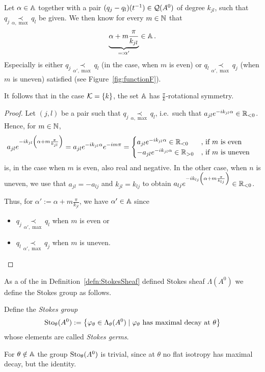 \begin{lem}\label{lem:rotationalSym}%
  Let $\alpha\in\mathbb{A}$ together with a pair $(q_j-q_l)(t^{-1})\in\mathcal{Q}(A^0)$ of
  degree $k_{jl}$, such that $q_j \underset{\alpha,\max}{\prec} q_l$ be given.
  We then know for every $m\in\mathbb{N}$ that
  \[
    \underset{=:\alpha'}{\underbrace{\alpha+m\frac{\pi}{k_{jl}}}} \in \mathbb{A} \,.
  \]
  Especially is either $q_j \underset{\alpha',\max}{\prec} q_l$ (in the
  case, when $m$ is even) or $q_l \underset{\alpha',\max}{\prec} q_j$
  (when $m$ is uneven) satisfied (see Figure~\ref{fig:functionF}).
  \begin{s-cor}
    It follows that in the case $\mathcal{K}=\{k\}$, the set $\mathbb{A}$ has
    $\frac{\pi}{k}$-rotational symmetry.
  \end{s-cor}
\end{lem}
\begin{proof}
  Let $(j,l)$ be a pair such that
  $q_j \underset{\alpha,\max}{\prec} q_l$, i.e.\ such that
  $a_{jl}e^{-ik_{jl}\alpha}\in\mathbb{R}_{<0}$.
  Hence, for $m\in\mathbb{N}$,
  \begin{align*}
    a_{jl}e^{-ik_{jl}\left(\alpha+m\frac{\pi}{k_{jl}}\right)}
    &=a_{jl}e^{-ik_{jl}\alpha}e^{-im\pi}
    = \begin{cases}
      a_{jl}e^{-ik_{jl}\alpha}\in\mathbb{R}_{<0}
        & \text{, if $m$ is even}
    \\-a_{jl}e^{-ik_{jl}\alpha}\in\mathbb{R}_{>0}
        & \text{, if $m$ is uneven}
    \end{cases}
  \end{align*}
  is, in the case when $m$ is even, also real and negative. In the other
  case, when $n$ is uneven, we use that $a_{jl}=-a_{lj}$ and $k_{jl}=k_{lj}$ to
  obtain
  $a_{lj}e^{-ik_{lj}\left(\alpha+m\frac{\pi}{k_{lj}}\right)} \in\mathbb{R}_{<0}$.

  Thus, for $\alpha':=\alpha+m\frac{\pi}{k_{jl}}$, we have $\alpha'\in\mathbb{A}$ since
  \begin{itemize}
    \item $q_j \underset{\alpha',\max}{\prec} q_l$ when $m$ is even or
    \item $q_l \underset{\alpha',\max}{\prec} q_j$ when $m$ is uneven.
  \end{itemize}
\end{proof}

As a  of the in
Definition~\ref{defn:StokesSheaf} defined Stokes sheaf $\Lambda(A^0)$ we
define the Stokes group as follows.
\begin{defn}\label{defn:stokesGroup}
  Define the \emph{Stokes group}
  \[
    \operatorname{Sto}_\theta(A^0):=
    \left\{\varphi_\theta\in\Lambda_\theta(A^0)
      \mid \varphi_\theta \text{~has maximal decay at~} \theta
    \right\}
  \]
  whose elements are called \emph{Stokes germs}.
  \begin{s-rem}
    For $\theta\notin\mathbb{A}$ the group $\operatorname{Sto}_\theta(A^0)$ is trivial, since at
    $\theta$ no flat isotropy has maximal decay, but the identity.
  \end{s-rem}
\end{defn}


